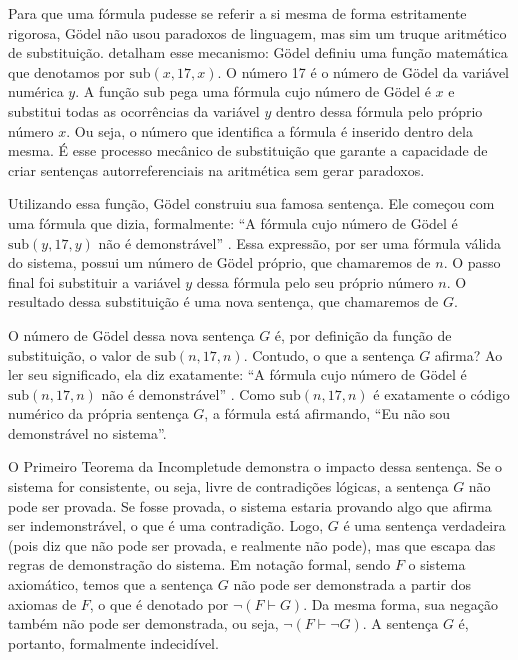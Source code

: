 Para que uma fórmula pudesse se referir a si mesma de forma estritamente rigorosa, Gödel não usou paradoxos de linguagem, mas sim um truque aritmético de substituição. \textcite[p.~89]{nagel2001} detalham esse mecanismo: Gödel definiu uma função matemática que denotamos por \(\mathrm{sub}(x, 17, x)\). O número 17 é o número de Gödel da variável numérica \(y\). A função \(\mathrm{sub}\) pega uma fórmula cujo número de Gödel é \(x\) e substitui todas as ocorrências da variável \(y\) dentro dessa fórmula pelo próprio número \(x\). Ou seja, o número que identifica a fórmula é inserido dentro dela mesma. É esse processo mecânico de substituição que garante a capacidade de criar sentenças autorreferenciais na aritmética sem gerar paradoxos.

Utilizando essa função, Gödel construiu sua famosa sentença. Ele começou com uma fórmula que dizia, formalmente: ``A fórmula cujo número de Gödel é \(\mathrm{sub}(y, 17, y)\) não é demonstrável'' \parencite[p.~96]{nagel2001}. Essa expressão, por ser uma fórmula válida do sistema, possui um número de Gödel próprio, que chamaremos de \(n\). O passo final foi substituir a variável \(y\) dessa fórmula pelo seu próprio número \(n\). O resultado dessa substituição é uma nova sentença, que chamaremos de \(G\).

O número de Gödel dessa nova sentença \(G\) é, por definição da função de substituição, o valor de \(\mathrm{sub}(n, 17, n)\). Contudo, o que a sentença \(G\) afirma? Ao ler seu significado, ela diz exatamente: ``A fórmula cujo número de Gödel é \(\mathrm{sub}(n, 17, n)\) não é demonstrável'' \parencite[p.~97]{nagel2001}. Como \(\mathrm{sub}(n, 17, n)\) é exatamente o código numérico da própria sentença \(G\), a fórmula está afirmando, ``Eu não sou demonstrável no sistema''.

O Primeiro Teorema da Incompletude demonstra o impacto dessa sentença. Se o sistema for consistente, ou seja, livre de contradições lógicas, a sentença \(G\) não pode ser provada. Se fosse provada, o sistema estaria provando algo que afirma ser indemonstrável, o que é uma contradição. Logo, \(G\) é uma sentença verdadeira (pois diz que não pode ser provada, e realmente não pode), mas que escapa das regras de demonstração do sistema. Em notação formal, sendo \(F\) o sistema axiomático, temos que a sentença \(G\) não pode ser demonstrada a partir dos axiomas de \(F\), o que é denotado por \(\neg(F \vdash G)\). Da mesma forma, sua negação também não pode ser demonstrada, ou seja, \(\neg(F \vdash \neg G)\). A sentença \(G\) é, portanto, formalmente indecidível.
